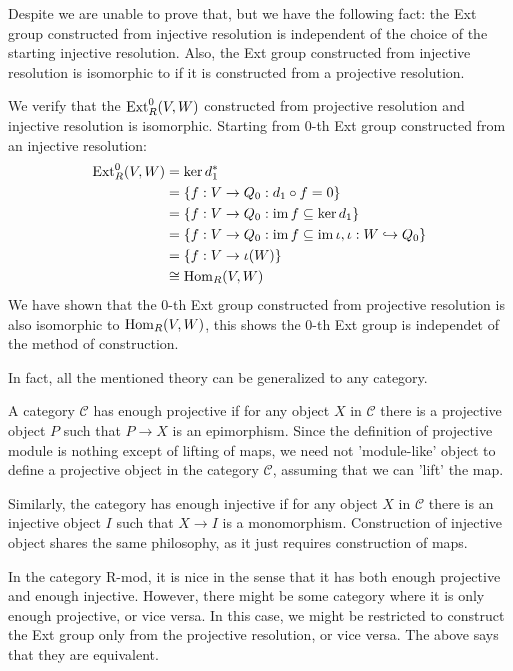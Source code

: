 \medskip

\begin{re}
    Despite we are unable to prove that, but we have the following fact: the Ext group constructed from injective resolution is independent of the choice of the starting injective resolution. Also, the Ext group constructed from injective resolution is isomorphic to if it is constructed from a projective resolution.
\end{re}

\medskip

\begin{ex}
    We verify that the $\operatorname{Ext}^0_R(V,W)$ constructed from projective resolution and injective resolution is isomorphic. Starting from $0$-th Ext group constructed from an injective resolution:
    \begin{align*}
        \operatorname{Ext}_R^0(V,W) &= \ker d_1^* \\
        &= \left\{f:V\to Q_0:d_1\circ f = 0\right\}\\
        &= \left\{f:V\to Q_0:\operatorname{im} f\subseteq \ker d_1\right\}\\
        &= \left\{f:V\to Q_0 : \operatorname{im} f\subseteq \operatorname{im} \iota, \iota: W\hookrightarrow Q_0\right\}\\
        &= \left\{f:V\to \iota(W)\right\}\\
        &\cong \operatorname{Hom}_R(V,W)
    \end{align*}
    We have shown that the $0$-th Ext group constructed from projective resolution is also isomorphic to $\operatorname{Hom}_R(V,W)$, this shows the $0$-th Ext group is independet of the method of construction.
\end{ex}

\medskip

\begin{re} 
    In fact, all the mentioned theory can be generalized to any category.
    
    A category $\mathcal C$ has enough projective if for any object $X$ in $\mathcal C$ there is a projective object $P$ such that $P\to X$ is an epimorphism. Since the definition of projective module is nothing except of lifting of maps, we need not 'module-like' object to define a projective object in the category $\mathcal C$, assuming that we can 'lift' the map.

    Similarly, the category has enough injective if for any object $X$ in $\mathcal C$ there is an injective object $I$ such that $X\to I$ is a monomorphism. Construction of injective object shares the same philosophy, as it just requires construction of maps.

    In the category R-mod, it is nice in the sense that it has both enough projective and enough injective. However, there might be some category where it is only enough projective, or vice versa. In this case, we might be restricted to construct the Ext group only from the projective resolution, or vice versa. The above says that they are equivalent.
\end{re}

